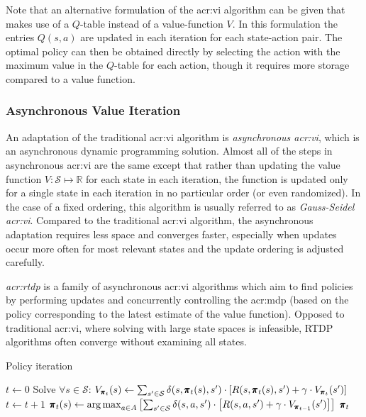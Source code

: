 Note that an alternative formulation of the \acrshort{acr:vi} algorithm can be given that makes use of a $Q$-table instead of a value-function $V$.
In this formulation the entries $Q(s, a)$ are updated in each iteration for each state-action pair.
The optimal policy can then be obtained directly by selecting the action with the maximum value in the $Q$-table for each action, though it requires more storage compared to a value function.\newpage

\subsubsection{Asynchronous Value Iteration}
\label{sec:gs-value-iteration}

An adaptation of the traditional \acrshort{acr:vi} algorithm is \textit{asynchronous \acrshort{acr:vi}}, which is an asynchronous dynamic programming solution.
Almost all of the steps in asynchronous \acrshort{acr:vi} are the same except that rather than updating the value function $V: \mathcal{S} \mapsto \mathbb{R}$ for each state in each iteration, the function is updated only for a single state in each iteration in no particular order (or even randomized).
In the case of a fixed ordering, this algorithm is usually referred to as \textit{Gauss-Seidel \acrshort{acr:vi}}.
Compared to the traditional \acrshort{acr:vi} algorithm, the asynchronous adaptation requires less space and converges faster, especially when updates occur more often for most relevant states and the update ordering is adjusted carefully.

\textit{\acrfull{acr:rtdp}} \cite{barto1995learning} is a family of asynchronous \acrshort{acr:vi} algorithms which aim to find policies by performing updates and concurrently controlling the \acrshort{acr:mdp} (based on the policy corresponding to the latest estimate of the value function).
Opposed to traditional \acrshort{acr:vi}, where solving  with large state spaces is infeasible, RTDP algorithms often converge without examining all states.


\begin{algorithm}[]
	\caption{Policy iteration}
	\label{alg:pi}
	\begin{algorithmic}[1]
		\State $t \gets 0$
		\Repeat
		\State Solve $\forall s \in \mathcal{S}$: $V_{\pmb{\pi}_{t}}(s) \gets \sum_{s' \in \mathcal{S}} \delta(s, \pmb{\pi}_t(s), s') \cdot \left[R(s, \pmb{\pi}_t(s), s') + \gamma \cdot V_{\pmb{\pi}_{t}}(s')\right]$
		\State $t \gets t + 1$
		\State $\pmb{\pi}_t(s) \gets \operatorname*{arg\,max}_{a \in A} \left[\sum_{s' \in \mathcal{S}} \delta(s, a, s') \cdot \left[R(s, a, s') + \gamma \cdot V_{\pmb{\pi}_{t - 1}}(s')\right]\right]$
		\EndFor
		\State\Return $\pmb{\pi}_t$
	\end{algorithmic}
\end{algorithm}

